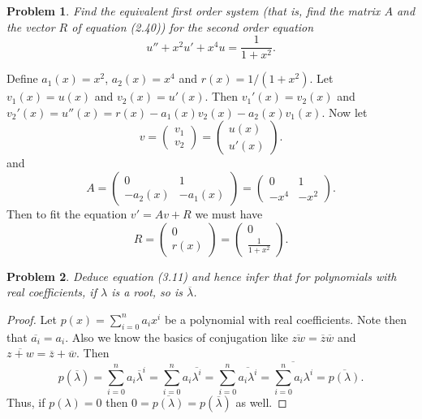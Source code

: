 \documentclass{article}
\newtheorem{problem}{Problem}
\begin{document}
\begin{problem}
Find the equivalent first order system (that is, find the matrix $A$ and the vector $R$ of equation (2.40)) for the second order equation
\[
u'' + x^2u' + x^4u = \frac{1}{1+x^2}.
\]
\end{problem}

Define $a_1(x) = x^2$, $a_2(x) = x^4$ and $r(x) = 1/(1 + x^2)$. Let $v_1(x) = u(x)$ and $v_2(x) = u'(x)$. Then $v_1'(x) = v_2(x)$ and $v_2'(x) = u''(x) = r(x) - a_1(x)v_2(x) - a_2(x)v_1(x)$. Now let
\[
v =
\left (
\begin{array}{c}
v_1\\
v_2
\end{array}
\right )
=
\left (
\begin{array}{c}
u(x)\\
u'(x)
\end{array}
\right).
\]
and
\[
A =
\left (
\begin{array}{cc}
0 & 1\\
-a_2(x) & -a_1(x)
\end{array}
\right )
=
\left (
\begin{array}{cc}
0 & 1\\
-x^4 & -x^2
\end{array}
\right ).
\]
Then to fit the equation $v' = Av + R$ we must have
\[
R =
\left (
\begin{array}{c}
0\\
r(x)
\end{array}
\right )
=
\left (
\begin{array}{c}
0\\
\frac{1}{1 + x^2}
\end{array}
\right).
\]

\begin{problem}
Deduce equation (3.11) and hence infer that for polynomials with real coefficients, if $\lambda$ is a root, so is $\overline{\lambda}$.
\end{problem}
\begin{proof}
Let $p(x) = \sum_{i=0}^n a_i x^i$ be a polynomial with real coefficients. Note then that $\overline{a_i} = a_i$. Also we know the basics of conjugation like $\overline{zw} = \overline{z}\overline{w}$ and $\overline{z + w} = \overline{z} + \overline{w}$. Then
\[
p(\overline{\lambda}) = \sum_{i=0}^n a_i \overline{\lambda}^i = \sum_{i=0}^n a_i \overline{\lambda^i} = \sum_{i=0}^n \overline{a_i \lambda^i} = \overline{\sum_{i=0}^n a_i \lambda^i} = \overline{p(\lambda)}.
\]
Thus, if $p(\lambda) = 0$ then $0 = \overline{p(\lambda)} = p(\overline{\lambda})$ as well.
\end{proof}
\end{document}
